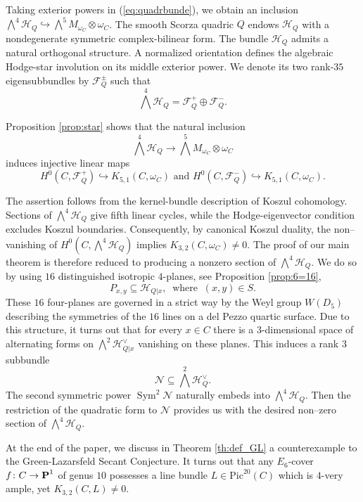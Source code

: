 \documentclass[11pt]{amsart}
\theoremstyle{definition}
\def\PP{{\textbf P}}
\def\cH{\mathcal{H}}
\begin{document}
\vskip 4pt

Taking exterior powers in  (\ref{eq:quadrbunde}), we obtain an inclusion
$ \bigwedge^4 \cH_Q\hookrightarrow \bigwedge^5 M_{\omega_C}\otimes \omega_C$. The smooth Scorza quadric $Q$ endows $\mathcal H_Q$ with a nondegenerate symmetric complex-bilinear form.  The bundle $\mathcal H_Q$ admits a natural orthogonal structure. A normalized orientation defines the algebraic Hodge-star involution on its middle exterior power. We denote its two rank-$35$ eigensubbundles by $\mathcal F_Q^\pm$ such that 
\[
 \bigwedge^4\mathcal H_Q=\mathcal F_Q^+\oplus\mathcal F_Q^-.
\]


\vskip 4pt

Proposition \ref{prop:star} shows that the natural inclusion
\[
 \bigwedge^4\mathcal H_Q\longrightarrow
 \bigwedge^5 M_{\omega_C}\otimes\omega_C
\]
induces injective linear maps
\[
 H^0(C,\mathcal F_Q^+)\hookrightarrow K_{5,1}(C,\omega_C)\mbox{ and } H^0(C,\mathcal F_Q^-)\hookrightarrow K_{5,1}(C,\omega_C).
\]

The assertion follows from the kernel-bundle description of Koszul cohomology. Sections of $\bigwedge^4\mathcal H_Q$ give fifth linear cycles, while the Hodge-eigenvector condition excludes Koszul boundaries. Consequently, by canonical Koszul duality, the non--vanishing of $H^0(C,\bigwedge^4\mathcal H_Q)$ implies $K_{3,2}(C,\omega_C)\ne0$. The proof of our main theorem is therefore reduced to producing a nonzero section of $\bigwedge^4\mathcal H_Q$. We do so by using $16$ distinguished isotropic $4$-planes, see Proposition \ref{prop:6=16},
$$P_{x,y}\subseteq \cH_{Q|x},\  \mbox{ where } \ (x,y)\in S. $$
These $16$ four-planes are governed in a strict way by the Weyl group $W(D_5)$ describing the symmetries of the $16$ lines on a del Pezzo quartic surface. Due to this structure, it turns out that for every $x\in C$ there is a $3$-dimensional space of alternating forms on $\bigwedge^2 \cH_{Q|x}^{\vee}$ vanishing on these planes. This induces a rank $3$ subbundle 
$$\mathcal N\subseteq \bigwedge^2\mathcal H_Q^\vee.$$ 
The second symmetric power $\operatorname{Sym}^2\mathcal{N}$  naturally embeds into $\bigwedge^4\mathcal H_Q$. Then the restriction of the quadratic form to $\mathcal{N}$ provides us with the desired non--zero section of $\bigwedge^4\mathcal H_Q$.

\vskip 4pt

At the end of the paper, we discuss in Theorem \ref{th:def_GL} a counterexample to the Green-Lazarsfeld Secant Conjecture. It turns out that any $E_6$-cover $f\colon C\rightarrow \PP^1$ of genus $10$ possesses a line bundle $L\in \mbox{Pic}^{20}(C)$ which is $4$-very ample, yet $K_{3,2}(C,L)\neq 0$.
\end{document}

